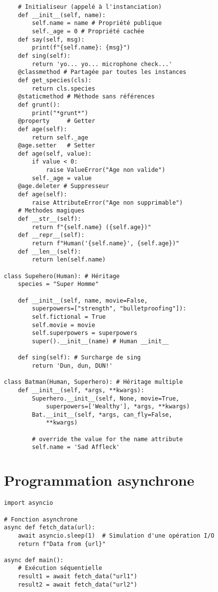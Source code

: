 \documentclass{article}
\begin{document}
\begin{multicols*}{4}
\begin{lstlisting}
    # Initialiseur (appelé à l'instanciation)
    def __init__(self, name):
        self.name = name # Propriété publique
        self._age = 0 # Propriété cachée
    def say(self, msg):
        print(f"{self.name}: {msg}")
    def sing(self):
        return 'yo... yo... microphone check...'
    @classmethod # Partagée par toutes les instances
    def get_species(cls):
        return cls.species
    @staticmethod # Méthode sans références
    def grunt():
        print("*grunt*")
    @property     # Getter
    def age(self):
        return self._age
    @age.setter   # Setter
    def age(self, value):
        if value < 0:
            raise ValueError("Age non valide")
        self._age = value
    @age.deleter # Suppresseur
    def age(self):
        raise AttributeError("Age non supprimable")
    # Methodes magiques
    def __str__(self):
        return f"{self.name} ({self.age})"
    def __repr__(self):
        return f"Human('{self.name}', {self.age})"
    def __len__(self):
        return len(self.name)

class Supehero(Human): # Héritage
    species = "Super Homme"

    def __init__(self, name, movie=False,
        superpowers=["strength", "bulletproofing"]):
        self.fictional = True
        self.movie = movie
        self.superpowers = superpowers
        super().__init__(name) # Human __init__

    def sing(self): # Surcharge de sing
        return 'Dun, dun, DUN!'

class Batman(Human, Superhero): # Héritage multiple
    def __init__(self, *args, **kwargs):
        Superhero.__init__(self, None, movie=True,
            superpowers=['Wealthy'], *args, **kwargs)
        Bat.__init__(self, *args, can_fly=False,
            **kwargs)

        # override the value for the name attribute
        self.name = 'Sad Affleck'
\end{lstlisting}

\section*{Programmation asynchrone}
\begin{lstlisting}
import asyncio

# Fonction asynchrone
async def fetch_data(url):
    await asyncio.sleep(1)  # Simulation d'une opération I/O
    return f"Data from {url}"

async def main():
    # Exécution séquentielle
    result1 = await fetch_data("url1")
    result2 = await fetch_data("url2")
    

\end{lstlisting}
\end{multicols*}
\end{document}
